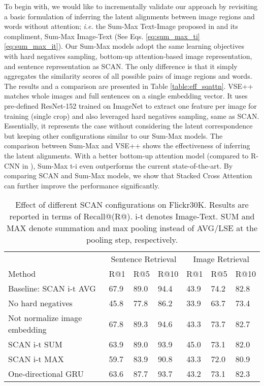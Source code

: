 \documentclass[runningheads]{llncs}
\begin{document}
To begin with, we would like to incrementally validate our approach by revisiting a basic formulation of inferring the latent alignments between image regions and words without attention; {\em i.e.} the Sum-Max Text-Image proposed in \cite{karpathy2015deep} and its compliment, Sum-Max Image-Text (See Eqs. \eqref{eq:sum_max_ti} \eqref{eq:sum_max_it}). Our Sum-Max models adopt the same learning objectives with hard negatives sampling, bottom-up attention-based image representation, and sentence representation as SCAN. The only difference is that it simply aggregates the similarity scores of all possible pairs of image regions and words. The results and a comparison are presented in Table \ref{table:eff_sqattn}. VSE++ \cite{faghri2017vse++} matches whole images and full sentences on a single embedding vector. It uses pre-defined ResNet-152 trained on ImageNet \cite{deng2009imagenet} to extract one feature per image for training (single crop) and also leveraged hard negatives sampling, same as SCAN. 
Essentially, it represents the case without considering the latent correspondence but keeping other configurations similar to our Sum-Max models. The comparison between Sum-Max and VSE++ shows the effectiveness of inferring the latent alignments. 
With a better bottom-up attention model (compared to R-CNN in \cite{karpathy2015deep}), Sum-Max t-i even outperforms the current state-of-the-art. By comparing SCAN and Sum-Max models, we show that Stacked Cross Attention can further improve the performance significantly.

\begin{table}[t!]
\begin{center}
\caption{Effect of different SCAN configurations on Flickr30K. Results are reported in terms of Recall@(R@). i-t denotes Image-Text. SUM and MAX denote summation and max pooling instead of AVG/LSE at the pooling step, respectively.}
\label{table:ablation}
\begin{tabular}
{p{5.0cm}p{1.0cm}p{1.0cm}p{1.0cm}p{1.0cm}p{1.0cm}p{1.0cm}}
\hline\noalign{\smallskip}
 & \multicolumn{3}{c}{Sentence Retrieval} & \multicolumn{3}{c}{Image Retrieval} \\
Method & R@1 & R@5 & R@10 & R@1 & R@5 & R@10 \\
\noalign{\smallskip}
\hline
Baseline: SCAN i-t AVG & 67.9 & 89.0 & 94.4 & 43.9 & 74.2 & 82.8  \\ 
\hline
\noalign{\smallskip}
No hard negatives & 45.8 & 77.8 & 86.2 & 33.9 & 63.7 & 73.4  \\ 
Not normalize image embedding & 67.8 & 89.3 & 94.6 & 43.3 & 73.7 & 82.7 \\ 
SCAN i-t SUM  & 63.9 & 89.0 & 93.9 & 45.0 & 73.1 & 82.0 \\ 
SCAN i-t MAX  & 59.7 & 83.9 & 90.8 & 43.3 & 72.0 & 80.9  \\ 
One-directional GRU & 63.6 & 87.7 & 93.7 & 43.2 & 73.1 & 82.3  \\ 
\hline
\end{tabular}
\end{center}
\end{table}
\setlength{\tabcolsep}{1.4pt}
\end{document}
